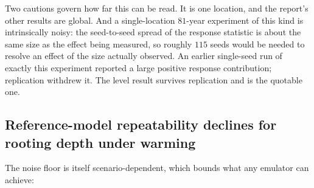 \documentclass[11pt]{article}
\begin{document}
Two cautions govern how far this can be read. It is one location, and the report's other results are global. And a single-location $81$-year experiment of this kind is intrinsically noisy: the seed-to-seed spread of the response statistic is about the same size as the effect being measured, so roughly $115$ seeds would be needed to resolve an effect of the size actually observed. An earlier single-seed run of exactly this experiment reported a large positive response contribution; replication withdrew it. The level result survives replication and is the quotable one.

\subsection{Reference-model repeatability declines for rooting depth under warming}

The noise floor is itself scenario-dependent, which bounds what any emulator can achieve:
\end{document}
